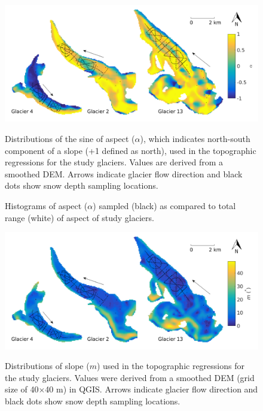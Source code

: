 \documentclass{sfuthesis}
\newcommand{\topomap}{Arrows indicate glacier flow direction and black dots show snow depth sampling locations. }
\begin{document}
\begin{figure}[H]
	\centering
	\includegraphics[width=\textwidth]{Map_aspect.png}\\
	\caption{Distributions of the sine of aspect ($\alpha$), which indicates north-south component of a slope (+1 defined as north), used in the topographic regressions for the study glaciers. Values are derived from a smoothed DEM. \topomap}
	\label{map:aspect}
\end{figure}

\begin{figure}[H]
	\caption{Histograms of aspect ($\alpha$) sampled (black) as compared to total range (white) of aspect of study glaciers.}
	\label{sampledRange:aspect}
\end{figure}

\begin{figure}[H]
	\centering
	\includegraphics[width=\textwidth]{Map_slope.png}\\
	\caption{Distributions of slope ($m$) used in the topographic regressions for the study glaciers. Values were derived from a smoothed DEM (grid size of 40$\times$40 m) in QGIS. \topomap}
	\label{map:slope}
\end{figure}
\end{document}
